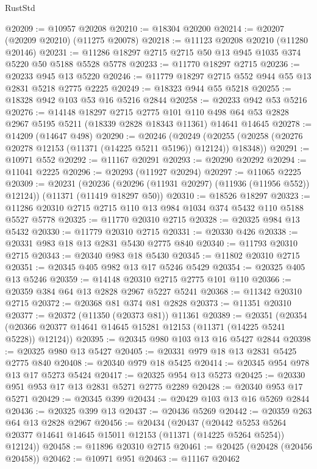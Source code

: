 \begin{lexlean}{RustStd}
\begin{coremodule}
@20209 := @10957 @20208
@20210 := @18304 @20200
@20214 := @20207 (@20209 @20210) (@11275 @20078)
@20218 := @11123 @20208 @20210 (@11280 @20146)
@20231 := @11286 @18297 @2715 @2715 @50 @13 @945 @1035 @374 @5220 @50 @5188 @5528 @5778
@20233 := @11770 @18297 @2715
@20236 := @20233 @945 @13 @5220
@20246 := @11779 @18297 @2715 @552 @944 @55 @13 @2831 @5218 @2775 @2225
@20249 := @18323 @944 @55 @5218
@20255 := @18328 @942 @103 @53 @16 @5216 @2844
@20258 := @20233 @942 @53 @5216
@20276 := @14148
    @18297
    @2715
    @2775
    @101
    @110
    @498
    @64
    @53
    @2828
    @2967
    @5195
    @5211
    (@18339 @2828 @18343 @11361)
    @14641
    @14645
@20278 := @14209 (@14647 @498)
@20290 := @20246
    (@20249 (@20255 (@20258 (@20276 @20278 @12153 (@11371 (@14225 @5211 @5196)) @12124)) @18348))
@20291 := @10971 @552
@20292 := @11167 @20291
@20293 := @20290 @20292
@20294 := @11041 @2225
@20296 := @20293 (@11927 @20294)
@20297 := @11065 @2225
@20309 := @20231
    (@20236 (@20296 (@11931 @20297) (@11936 (@11956 @552)) @12124))
    (@11371 (@11419 @18297 @50))
@20310 := @18526 @18297
@20323 := @11286 @20310 @2715 @2715 @110 @13 @984 @1034 @374 @5432 @110 @5188 @5527 @5778
@20325 := @11770 @20310 @2715
@20328 := @20325 @984 @13 @5432
@20330 := @11779 @20310 @2715
@20331 := @20330 @426
@20338 := @20331 @983 @18 @13 @2831 @5430 @2775 @840
@20340 := @11793 @20310 @2715
@20343 := @20340 @983 @18 @5430
@20345 := @11802 @20310 @2715
@20351 := @20345 @405 @982 @13 @17 @5246 @5429
@20354 := @20325 @405 @13 @5246
@20359 := @14148 @20310 @2715 @2775 @101 @110
@20366 := @20359 @384 @64 @13 @2828 @2967 @5227 @5241
@20368 := @11342 @20310 @2715
@20372 := @20368 @81 @374 @81 @2828
@20373 := @11351 @20310
@20377 := @20372 (@11350 (@20373 @81)) @11361
@20389 := @20351
    (@20354 (@20366 @20377 @14641 @14645 @15281 @12153 (@11371 (@14225 @5241 @5228)) @12124))
@20395 := @20345 @980 @103 @13 @16 @5427 @2844
@20398 := @20325 @980 @13 @5427
@20405 := @20331 @979 @18 @13 @2831 @5425 @2775 @840
@20408 := @20340 @979 @18 @5425
@20414 := @20345 @954 @978 @13 @17 @5273 @5424
@20417 := @20325 @954 @13 @5273
@20425 := @20330 @951 @953 @17 @13 @2831 @5271 @2775 @2289
@20428 := @20340 @953 @17 @5271
@20429 := @20345 @399
@20434 := @20429 @103 @13 @16 @5269 @2844
@20436 := @20325 @399 @13
@20437 := @20436 @5269
@20442 := @20359 @263 @64 @13 @2828 @2967
@20456 := @20434
    (@20437
      (@20442 @5253 @5264 @20377 @14641 @14645 @15011 @12153 (@11371 (@14225 @5264 @5254)) @12124))
@20458 := @11896 @20310 @2715
@20461 := @20425 (@20428 (@20456 @20458))
@20462 := @10971 @951
@20463 := @11167 @20462

\end{coremodule}
\end{lexlean}

